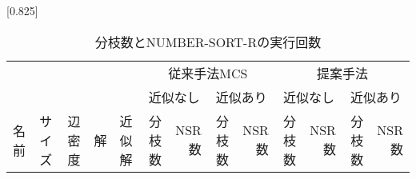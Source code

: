 \begin{table}
\centering
    \caption{分枝数とNUMBER-SORT-Rの実行回数}
    \label{tab:result_num}
\scalebox{0.8}[0.825]{ %
    \scriptsize
\begin{tabular}{|l|r|r|r|r|r|r|r|r||r|r|r|r|}
\hline	
    \multicolumn{5}{|c|}{ \multirow{2}{*}{入力グラフデータ} }
	& \multicolumn{4}{c||}{従来手法MCS} & \multicolumn{4}{c|}{提案手法}\\ \cline{6-13} 
	 \multicolumn{5}{|c|}{} & \multicolumn{2}{c|}{近似なし} & \multicolumn{2}{c||}{近似あり} & \multicolumn{2}{c|}{近似なし} & \multicolumn{2}{c|}{近似あり} \\ \hline
    \multicolumn{1}{|l|}{名前} & \multicolumn{1}{l|}{サイズ} & \multicolumn{1}{c|}{辺密度}& \multicolumn{1}{c|}{解} &\multicolumn{1}{l|}{近似解}
    & 分枝数 & NSR数 & 分枝数 & NSR数 & 分枝数 & NSR数 & 分枝数 & NSR数\\ \hline
    

\end{tabular}}
\end{table}
